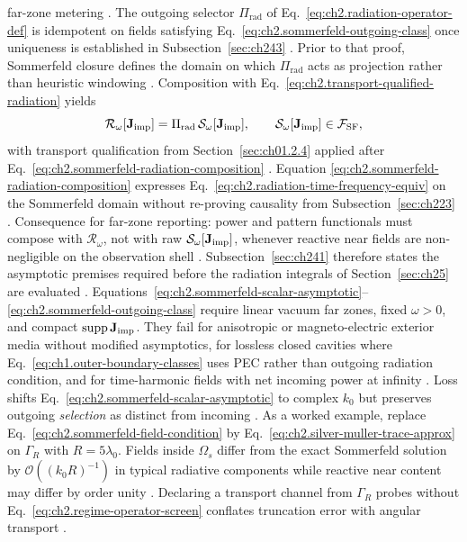 far-zone metering \cite{stratton1941}. The outgoing selector \(\Pi_{\mathrm{rad}}\) of
Eq.~\eqref{eq:ch2.radiation-operator-def} is idempotent on fields satisfying
Eq.~\eqref{eq:ch2.sommerfeld-outgoing-class} once uniqueness is established in
Subsection~\ref{sec:ch243} \cite{stratton1941}. Prior to that proof, Sommerfeld
closure defines the domain on which \(\Pi_{\mathrm{rad}}\) acts as projection rather than heuristic windowing \cite{harrington2001}. Composition with
Eq.~\eqref{eq:ch2.transport-qualified-radiation} yields
\begin{equation}
\label{eq:ch2.sommerfeld-radiation-composition}
\mathcal{R}_\omega[\mathbf{J}_{\mathrm{imp}}]
=
\Pi_{\mathrm{rad}}\,\mathcal{S}_\omega[\mathbf{J}_{\mathrm{imp}}],
\qquad
\mathcal{S}_\omega[\mathbf{J}_{\mathrm{imp}}]\in\mathcal{F}_{\mathrm{SF}},
\end{equation}
with transport qualification from Section~\ref{sec:ch01.2.4} applied after
Eq.~\eqref{eq:ch2.sommerfeld-radiation-composition} \cite{stratton1941}. Equation
\eqref{eq:ch2.sommerfeld-radiation-composition} expresses
Eq.~\eqref{eq:ch2.radiation-time-frequency-equiv} on the Sommerfeld domain without
re-proving causality from Subsection~\ref{sec:ch223} \cite{harrington2001}. Consequence for
far-zone reporting: power and pattern functionals must compose with $\mathcal{R}_\omega$, not with
raw $\mathcal{S}_\omega[\mathbf{J}_{\mathrm{imp}}]$, whenever reactive near fields are non-negligible on the
observation shell \cite{stratton1941}. Subsection~\ref{sec:ch241} therefore states
the asymptotic premises required before the radiation integrals of Section~\ref{sec:ch25}
are evaluated \cite{stratton1941}.
Equations~\eqref{eq:ch2.sommerfeld-scalar-asymptotic}--\eqref{eq:ch2.sommerfeld-outgoing-class}
require linear vacuum far zones, fixed \(\omega>0\), and compact \(\operatorname{supp}\mathbf{J}_{\mathrm{imp}}\).
They fail for anisotropic or magneto-electric exterior media without modified
asymptotics, for lossless closed cavities where Eq.~\eqref{eq:ch1.outer-boundary-classes}
uses PEC rather than outgoing radiation condition, and for time-harmonic fields with net incoming
power at infinity \cite{stratton1941}. Loss shifts
Eq.~\eqref{eq:ch2.sommerfeld-scalar-asymptotic} to complex \(k_0\) but preserves
outgoing \emph{selection} as distinct from incoming \cite{stratton1941}.
As a worked example, replace Eq.~\eqref{eq:ch2.sommerfeld-field-condition} by
Eq.~\eqref{eq:ch2.silver-muller-trace-approx} on \(\Gamma_R\) with \(R=5\lambda_0\).
Fields inside \(\Omega_s\) differ from the exact Sommerfeld solution by
\(\mathcal{O}((k_0 R)^{-1})\) in typical radiative components while reactive near
content may differ by order unity \cite{stratton1941}. Declaring a
transport channel from \(\Gamma_R\) probes without
Eq.~\eqref{eq:ch2.regime-operator-screen} conflates truncation error with angular
transport \cite{stratton1941}.
